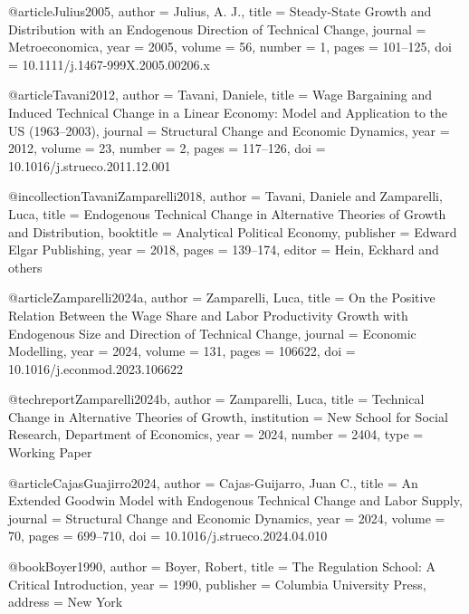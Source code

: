 @article{Julius2005,
	author  = {Julius, A. J.},
	title   = {Steady-State Growth and Distribution with an Endogenous Direction of Technical Change},
	journal = {Metroeconomica},
	year    = {2005},
	volume  = {56},
	number  = {1},
	pages   = {101--125},
	doi     = {10.1111/j.1467-999X.2005.00206.x}
}

@article{Tavani2012,
	author  = {Tavani, Daniele},
	title   = {Wage Bargaining and Induced Technical Change in a Linear Economy: Model and Application to the {US} (1963--2003)},
	journal = {Structural Change and Economic Dynamics},
	year    = {2012},
	volume  = {23},
	number  = {2},
	pages   = {117--126},
	doi     = {10.1016/j.strueco.2011.12.001}
}

@incollection{TavaniZamparelli2018,
	author    = {Tavani, Daniele and Zamparelli, Luca},
	title     = {Endogenous Technical Change in Alternative Theories of Growth and Distribution},
	booktitle = {Analytical Political Economy},
	publisher = {Edward Elgar Publishing},
	year      = {2018},
	pages     = {139--174},
	editor    = {Hein, Eckhard and others}
}

@article{Zamparelli2024a,
	author  = {Zamparelli, Luca},
	title   = {On the Positive Relation Between the Wage Share and Labor Productivity Growth with Endogenous Size and Direction of Technical Change},
	journal = {Economic Modelling},
	year    = {2024},
	volume  = {131},
	pages   = {106622},
	doi     = {10.1016/j.econmod.2023.106622}
}

@techreport{Zamparelli2024b,
	author      = {Zamparelli, Luca},
	title       = {Technical Change in Alternative Theories of Growth},
	institution = {New School for Social Research, Department of Economics},
	year        = {2024},
	number      = {2404},
	type        = {Working Paper}
}

@article{CajasGuajirro2024,
	author  = {Cajas-Guijarro, Juan C.},
	title   = {An Extended {Goodwin} Model with Endogenous Technical Change and Labor Supply},
	journal = {Structural Change and Economic Dynamics},
	year    = {2024},
	volume  = {70},
	pages   = {699--710},
	doi     = {10.1016/j.strueco.2024.04.010}
}





@book{Boyer1990,
	author    = {Boyer, Robert},
	title     = {The Regulation School: A Critical Introduction},
	year      = {1990},
	publisher = {Columbia University Press},
	address   = {New York}
}

